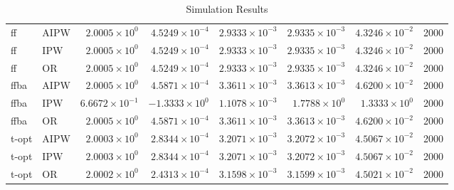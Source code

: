 \begin{table}[ht]
\begin{tabular}{llrrrrrr}
   \midrule
ff & AIPW & $2.0005 \times 10^{0}$ & $4.5249 \times 10^{-4}$ & $2.9333 \times 10^{-3}$ & $2.9335 \times 10^{-3}$ & $4.3246 \times 10^{-2}$ & 2000 \\ 
  ff & IPW & $2.0005 \times 10^{0}$ & $4.5249 \times 10^{-4}$ & $2.9333 \times 10^{-3}$ & $2.9335 \times 10^{-3}$ & $4.3246 \times 10^{-2}$ & 2000 \\ 
  ff & OR & $2.0005 \times 10^{0}$ & $4.5249 \times 10^{-4}$ & $2.9333 \times 10^{-3}$ & $2.9335 \times 10^{-3}$ & $4.3246 \times 10^{-2}$ & 2000 \\ 
   \midrule
ffba & AIPW & $2.0005 \times 10^{0}$ & $4.5871 \times 10^{-4}$ & $3.3611 \times 10^{-3}$ & $3.3613 \times 10^{-3}$ & $4.6200 \times 10^{-2}$ & 2000 \\ 
  ffba & IPW & $6.6672 \times 10^{-1}$ & $-1.3333 \times 10^{0}$ & $1.1078 \times 10^{-3}$ & $1.7788 \times 10^{0}$ & $1.3333 \times 10^{0}$ & 2000 \\ 
  ffba & OR & $2.0005 \times 10^{0}$ & $4.5871 \times 10^{-4}$ & $3.3611 \times 10^{-3}$ & $3.3613 \times 10^{-3}$ & $4.6200 \times 10^{-2}$ & 2000 \\ 
   \midrule
t-opt & AIPW & $2.0003 \times 10^{0}$ & $2.8344 \times 10^{-4}$ & $3.2071 \times 10^{-3}$ & $3.2072 \times 10^{-3}$ & $4.5067 \times 10^{-2}$ & 2000 \\ 
  t-opt & IPW & $2.0003 \times 10^{0}$ & $2.8344 \times 10^{-4}$ & $3.2071 \times 10^{-3}$ & $3.2072 \times 10^{-3}$ & $4.5067 \times 10^{-2}$ & 2000 \\ 
  t-opt & OR & $2.0002 \times 10^{0}$ & $2.4313 \times 10^{-4}$ & $3.1598 \times 10^{-3}$ & $3.1599 \times 10^{-3}$ & $4.5021 \times 10^{-2}$ & 2000 \\ 
   \bottomrule
\end{tabular}
\caption{Simulation Results} 
\label{tab:results}
\end{table}
